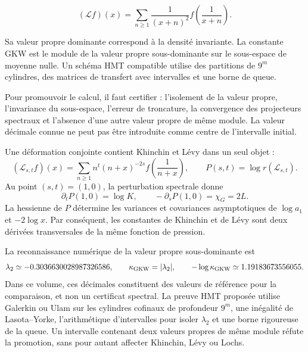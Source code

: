 \begin{equation}
(\mathcal L f)(x)=\sum_{n\ge1}\frac1{(x+n)^2}
f\!\left(\frac1{x+n}\right).
\label{eq:gkw-operator}
\end{equation}

Sa valeur propre dominante correspond à la densité invariante. La constante GKW est le module de la valeur propre sous-dominante sur le sous-espace de moyenne nulle. Un schéma HMT compatible utilise des partitions de \(9^m\) cylindres, des matrices de transfert avec intervalles et une borne de queue.

Pour promouvoir le calcul, il faut certifier : l'isolement de la valeur propre, l'invariance du sous-espace, l'erreur de troncature, la convergence des projecteurs spectraux et l'absence d'une autre valeur propre de même module. La valeur décimale connue ne peut pas être introduite comme centre de l'intervalle initial.

Une déformation conjointe contient Khinchin et Lévy dans un seul objet :
\begin{equation}
(\mathcal L_{s,t}f)(x)
=\sum_{n\ge1}n^t(n+x)^{-2s}
 f\!\left(\frac1{n+x}\right),
\qquad
P(s,t)=\log r(\mathcal L_{s,t}).
\label{eq:gauss-pressure-operator}
\end{equation}
Au point \((s,t)=(1,0)\), la perturbation spectrale donne
\begin{equation}
\partial_tP(1,0)=\log K,
\qquad
-\partial_sP(1,0)=\chi_G=2L.
\label{eq:pressure-derivatives}
\end{equation}
La hessienne de \(P\) détermine les variances et covariances asymptotiques de
\(\log a_1\) et \(-2\log x\). Par conséquent, les constantes de Khinchin et de
Lévy sont deux dérivées transversales de la même fonction de pression.

La reconnaissance numérique de la valeur propre sous-dominante est
\[
\lambda_2\simeq-0.3036630028987326586,\qquad
\kappa_{\rm GKW}=|\lambda_2|,\qquad
-\log\kappa_{\rm GKW}\simeq1.19183673556055.
\]
Dans ce volume, ces décimales constituent des valeurs de référence pour la
comparaison, et non un certificat spectral.
La preuve HMT proposée utilise Galerkin ou Ulam sur les cylindres cofinaux de
profondeur \(9^m\), une inégalité de Lasota--Yorke, l'arithmétique
d'intervalles pour isoler \(\lambda_2\) et une borne rigoureuse de la queue. Un
intervalle contenant deux valeurs propres de même module réfute la
promotion, sans pour autant affecter Khinchin, Lévy ou Lochs.

